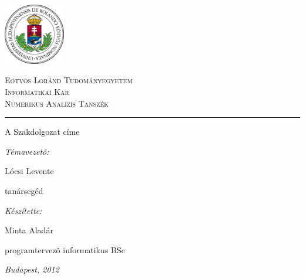 \begin{titlepage}

\noindent
\parbox[m]{0.2\textwidth}{
 \includegraphics[width=0.2\textwidth]{elte_logo_colored.eps} %
}
\hfill
\parbox[m]{0.7\textwidth}{
\begin{center}
\begin{large}
\textsc{
Eötvös Loránd Tudományegyetem\\
\vspace{0.5pc}
Informatikai Kar\\
\vspace{0.5pc}
Numerikus Analízis Tanszék\\
}
\end{large}
\end{center}
}

\vspace{1pc}
\hrule

\vfill

\begin{center}
{\LARGE A Szakdolgozat címe}
\end{center}

\vfill

\noindent
\hspace*{0.05\textwidth}
\parbox{0.45\textwidth}{
{\it Témavezetõ:}
\bigskip

{\Large Lócsi Levente}
\smallskip

tanársegéd
}
\hfill
\parbox{0.45\textwidth}{
{\it Készítette:}
\bigskip

{\Large Minta Aladár}
\smallskip

programtervezõ informatikus BSc
}


\vfill

\begin{center}
{\large {\it Budapest, 2012}}
\end{center}

\end{titlepage}
